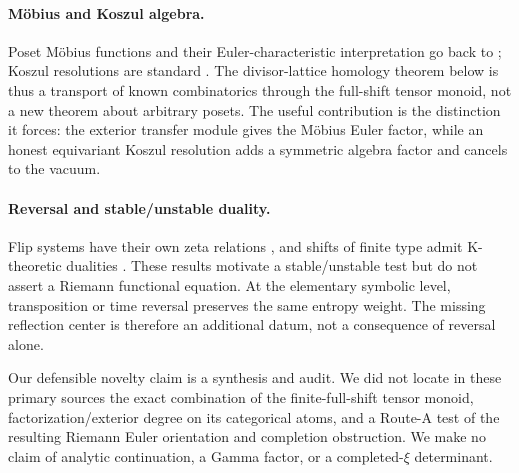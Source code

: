 \paragraph{M\"obius and Koszul algebra.}
Poset M\"obius functions and their Euler-characteristic interpretation go
back to \citet{rota1964}; Koszul resolutions are standard
\citep{priddy1970}. The divisor-lattice homology theorem below is thus a
transport of known combinatorics through the full-shift tensor monoid, not a
new theorem about arbitrary posets. The useful contribution is the
distinction it forces: the exterior transfer module gives the M\"obius Euler
factor, while an honest equivariant Koszul resolution adds a symmetric
algebra factor and cancels to the vacuum.

\paragraph{Reversal and stable/unstable duality.}
Flip systems have their own zeta relations \citep{kimleepark2003}, and shifts
of finite type admit K-theoretic dualities
\citep{kaminkerputnam1997}. These results motivate a stable/unstable test but
do not assert a Riemann functional equation. At the elementary symbolic
level, transposition or time reversal preserves the same entropy weight.
The missing reflection center is therefore an additional datum, not a
consequence of reversal alone.

Our defensible novelty claim is a synthesis and audit. We did not locate in
these primary sources the exact combination of the finite-full-shift tensor
monoid, factorization/exterior degree on its categorical atoms, and a
Route-A test of the resulting Riemann Euler orientation and completion
obstruction. We make no claim of analytic continuation, a Gamma factor, or a
completed-$\xi$ determinant.
